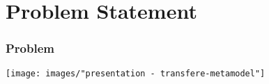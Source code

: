 \section{Problem Statement}


\begin{frame}
  \frametitle{Problem}
  \hspace{-1.5cm}
  \centering
  \texttt{[image: images/"presentation - transfere-metamodel"]}
\end{frame}






\begin{frame}
  \centering
  \hspace{-1cm}
  \huge
\end{frame}


\begin{frame}
  \centering
  \hspace{-1cm}
  \huge
\end{frame}




